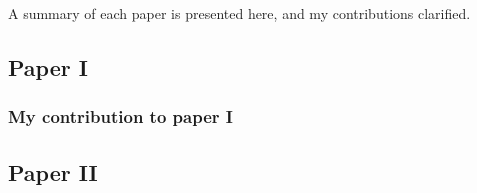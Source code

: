 
A summary of each paper is presented here, and my contributions clarified.

\subsection*{Paper I}





\subsubsection*{My contribution to paper I}



\subsection*{Paper II}

